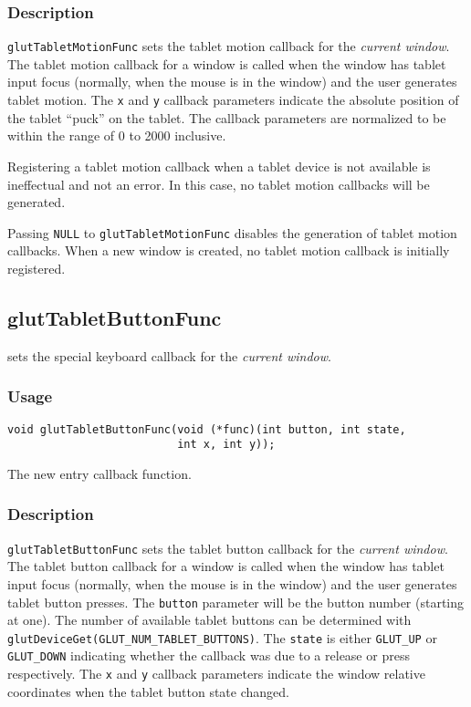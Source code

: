 \subsubsection*{Description}

{\tt glutTabletMotionFunc} sets the tablet motion callback for the {\em
current window}.  The tablet motion callback for a window is called when the
window has tablet input focus (normally, when the mouse is in the window)
and the user generates tablet motion.  The {\tt x} and {\tt y}
callback parameters indicate the absolute position of the tablet ``puck'' on
the tablet.
The callback parameters are normalized to be within the range of 0 to 2000
inclusive.

Registering a tablet motion callback when a tablet device is not available
is ineffectual and not an error.  In this case, no tablet motion callbacks
will be generated.

Passing {\tt NULL} to {\tt glutTabletMotionFunc} disables the generation of
tablet motion callbacks.  When a new window is created, no
tablet motion callback is initially registered.

\subsection{glutTabletButtonFunc}

 sets the special keyboard callback for the {\em current window}.

\subsubsection*{Usage}
\begin{verbatim}
void glutTabletButtonFunc(void (*func)(int button, int state,
                          int x, int y));
\end{verbatim}
\begin{description}
\itemsep 0in
\item[\tt func]
The new entry callback function.
\end{description}

\subsubsection*{Description}

{\tt glutTabletButtonFunc} sets the tablet button callback for the {\em
current window}.  The tablet button callback for a window is called when the
window has tablet input focus (normally, when the mouse is in the window)
and the user generates tablet button presses.  The {\tt button} parameter
will be the button number (starting at one).  The number of available tablet
buttons can be determined with {\tt glutDeviceGet(GLUT\_NUM\_TABLET\_BUTTONS)}.
The {\tt state} is either {\tt GLUT\_UP} or {\tt GLUT\_DOWN} indicating whether
the callback was due to a release or press respectively.
The {\tt x} and {\tt y} callback
parameters indicate the window relative coordinates when the tablet
button state changed.


